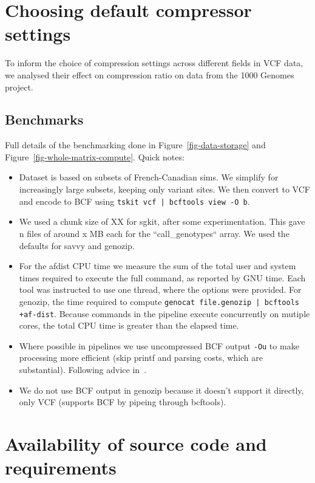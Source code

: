 \documentclass[a4paper,num-refs]{oup-contemporary}
\begin{document}
\section{Choosing default compressor settings}
To inform the choice of compression settings across different fields 
in VCF data, we analysed their effect on compression ratio on 
data from the 1000 Genomes project.


\subsection{Benchmarks}
Full details of the benchmarking done in
Figure~\ref{fig-data-storage} and
Figure~\ref{fig-whole-matrix-compute}.
Quick notes:

\begin{itemize}
\item Dataset is based on subsets of French-Canadian sims. We simplify
for increasingly large subsets, keeping only variant sites. We then
convert to VCF and encode to BCF using
\texttt{tskit vcf | bcftools view -O b}.
\item We used a chunk size of XX for sgkit, after some experimentation.
This gave n files of around x MB each for the ``call\_genotypes`` array.
We used the defaults for savvy and genozip.
\item For the afdist CPU time we measure the sum of the total user and
system times required to execute the full command, as reported by GNU
time. Each tool was instructed to use one thread, where the options
were provided. For genozip, the time required to compute
\texttt{genocat file.genozip | bcftools +af-dist}. Because commands
in the pipeline execute concurrently on mutiple cores, the total CPU time is
greater than the elapsed time.
\item Where possible in pipelines we use uncompressed BCF
 output \texttt{-Ou} to make processing more efficient (skip printf
and parsing costs, which are substantial). Following advice
in~\citep{danecek2021twelve}.
\item We do not use BCF output in genozip because it doesn't support
it directly, only VCF (supports BCF by pipeing through bcftools).
\end{itemize}

\section{Availability of source code and requirements}
\end{document}
